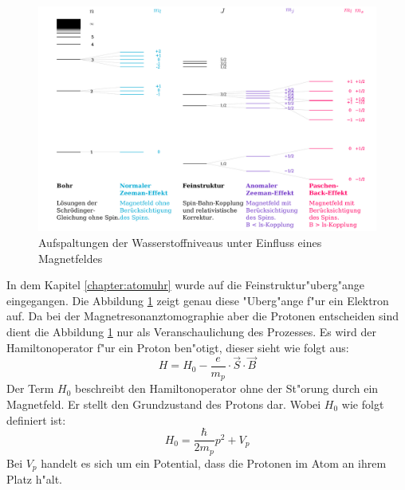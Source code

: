 \begin{figure}
	\includegraphics[width = \textwidth]{./mri/pic/index}
	\caption{Aufspaltungen der Wasserstoffniveaus unter Einfluss eines Magnetfeldes \cite{Zeeman}}
	\label{mri:quant:abb:zeeman}
\end{figure}
In dem Kapitel \ref{chapter:atomuhr} wurde auf die Feinstruktur"uberg"ange eingegangen. Die Abbildung \ref{mri:quant:abb:zeeman} zeigt genau diese "Uberg"ange f"ur ein Elektron auf. Da bei der Magnetresonanztomographie aber die Protonen entscheiden sind dient die Abbildung \ref{mri:quant:abb:zeeman} nur als Veranschaulichung des Prozesses. Es wird der Hamiltonoperator f"ur ein Proton ben"otigt, dieser sieht wie folgt aus:
\begin{equation}
H = H_0 - \frac{e}{m_p }\cdot \vec{S} \cdot \vec{B}
\label{mri:hamilton}
\end{equation}
Der Term $H_0$ beschreibt den Hamiltonoperator ohne der St"orung durch ein Magnetfeld. Er stellt den Grundzustand des Protons dar. Wobei $H_0$ wie folgt definiert ist:
\begin{equation}
H_0 = \frac{\hbar}{2m_p} p^2 + V_p
\end{equation}
Bei $V_p$ handelt es sich um ein Potential, dass die Protonen im Atom an ihrem Platz h"alt.

